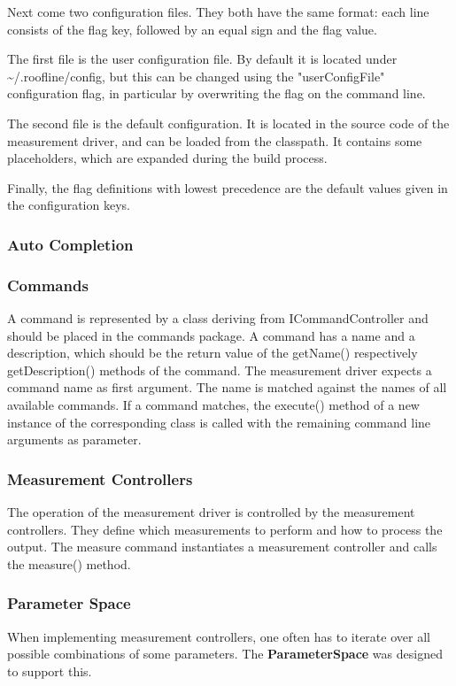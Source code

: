 \documentclass[a4paper,12pt]{article}
\newcommand{\class}[1]{\textbf{#1}}
\begin{document}
Next come two configuration files. They both have the same format: each line
consists of the flag key, followed by an equal sign and the flag value. 

The first file is the user configuration file. By default it is located under
\textasciitilde/.roofline/config, but this can be changed using the
"userConfigFile" configuration flag, in particular by overwriting the flag on
the command line.

The second file is the default configuration. It is located in the source code
of the measurement driver, and can be loaded from the classpath. It contains
some placeholders, which are expanded during the build process.

Finally, the flag definitions with lowest precedence are the default values
given in the configuration keys.

\subsubsection{Auto Completion}

\subsubsection{Commands}
A command is represented by a class deriving from ICommandController and should
be placed in the commands package. A command has a name and a description, which
should be the return value of the getName() respectively getDescription()
methods of the command. The measurement driver expects a command name as first
argument. The name is matched against the names of all available commands. If a
command matches, the execute() method of a new instance of the corresponding
class is called with the remaining command line arguments as parameter.

\subsubsection{Measurement Controllers}
The operation of the measurement driver is controlled by the measurement
controllers. They define which measurements to perform and how to process the
output. The measure command instantiates a measurement controller and calls the
measure() method.

\subsubsection{Parameter Space}
When implementing measurement controllers, one often has to iterate over all
possible combinations of some parameters. The \class{ParameterSpace} was
designed to support this. 
\end{document}
